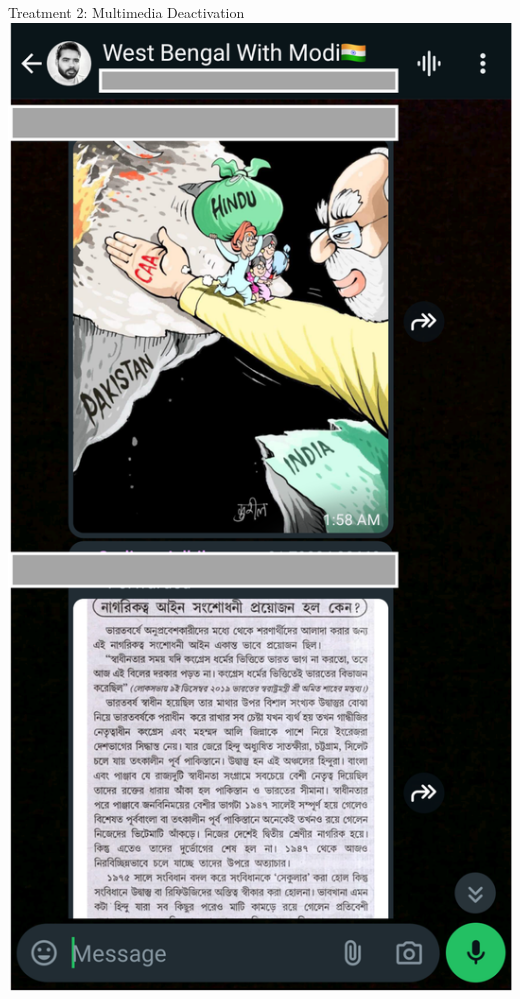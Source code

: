 \documentclass[usenames,dvipsnames,t]{beamer}
\begin{document}
\begin{frame}{Treatment 2: Multimedia Deactivation}
{\centering\includegraphics[scale=.35]{ss_tmedia_examplereal_dlpost}
}
\end{frame}
\end{document}

